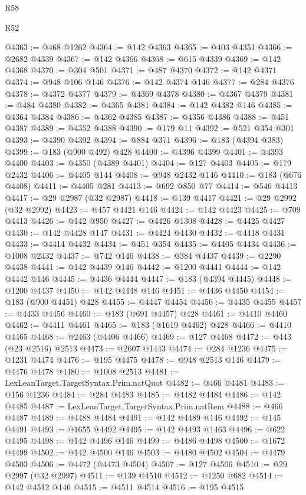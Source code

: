 \begin{lexlean}{R58}
\begin{lexlean}{R52}
\begin{coremodule}
{{{{{{{{{{{{{{{{{{{{{{{{{{{{{{{{{{{{{{{{{{{{{{{{{{{{{{{{{{{{{{{{{{{{{{{{{{{{{{{{{{{{{{{{{{{{{{{{{{{{{{{{{{{{{{{{{{{{{{{{{{{{{{{{{{{{{{{{{{{{{{{{{{{{{{{{{{{{{{{{{{{{{{{{{{{{{{{{{{{{{{{{{{{{{{{{{{{{{{@4363 := @468 @1262
@4364 := @142 @4363
@4365 := @403 @4351
@4366 := @2682 @4339
@4367 := @142 @4366
@4368 := @615 @4339
@4369 := @142 @4368
@4370 := @304 @501
@4371 := @487 @4370
@4372 := @142 @4371
@4374 := @948 @106 @146
@4376 := @142 @4374 @146
@4377 := @284 @4376
@4378 := @4372 @4377
@4379 := @4369 @4378
@4380 := @4367 @4379
@4381 := @484 @4380
@4382 := @4365 @4381
@4384 := @142 @4382 @146
@4385 := @4364 @4384
@4386 := @4362 @4385
@4387 := @4356 @4386
@4388 := @451 @4387
@4389 := @4352 @4388
@4390 := @179 @11
@4392 := @521 @354 @301
@4393 := @4390 @4392
@4394 := @884 @371
@4396 := @183 (@4394 @383)
@4399 := @183 (@900 @492) @428
@4400 := @4396 @4399
@4401 := @4393 @4400
@4403 := @4350 (@4389 @4401)
@4404 := @127 @4403
@4405 := @179 @2432
@4406 := @4405 @144
@4408 := @948 @2432 @146
@4410 := @183 (@676 @4408)
@4411 := @4405 @281
@4413 := @692 @850 @77
@4414 := @546 @4413
@4417 := @29 @2987 (@32 @2987)
@4418 := @139 @4417
@4421 := @29 @2992 (@32 @2992)
@4423 := @457 @4421 @146
@4424 := @142 @4423
@4425 := @709 @4413
@4426 := @142 @950
@4427 := @4426 @1308
@4428 := @4425 @4427
@4430 := @142 @4428 @147
@4431 := @4424 @4430
@4432 := @4418 @4431
@4433 := @4414 @4432
@4434 := @451 @354
@4435 := @4405 @4434
@4436 := @1008 @2432
@4437 := @742 @146
@4438 := @384 @4437
@4439 := @2290 @4438
@4441 := @142 @4439 @146
@4442 := @1200 @4441
@4444 := @142 @4442 @146
@4445 := @4436 @4444
@4447 := @183 (@4394 @4445)
@4448 := @1200 @4437
@4450 := @142 @4448 @146
@4451 := @4436 @4450
@4454 := @183 (@900 @4451) @428
@4455 := @4447 @4454
@4456 := @4435 @4455
@4457 := @4433 @4456
@4460 := @183 (@691 @4457) @428
@4461 := @4410 @4460
@4462 := @4411 @4461
@4465 := @183 (@1619 @4462) @428
@4466 := @4410 @4465
@4468 := @2463 (@4406 @4466)
@4469 := @127 @4468
@4472 := @443 (@23 @2516) @2513
@4473 := @2607 @1443
@4474 := @284 @1236
@4475 := @1231 @4474
@4476 := @195 @4475
@4478 := @948 @2513 @146
@4479 := @4476 @4478
@4480 := @1008 @2513
@4481 := LexLeanTarget.TargetSyntax.Prim.natQuot
@4482 := @466 @4481
@4483 := @156 @1236
@4484 := @284 @4483
@4485 := @4482 @4484
@4486 := @142 @4485
@4487 := LexLeanTarget.TargetSyntax.Prim.natRem
@4488 := @466 @4487
@4489 := @4488 @4484
@4491 := @142 @4489 @146
@4492 := @145 @4491
@4493 := @1655 @4492
@4495 := @142 @4493 @1463
@4496 := @622 @4495
@4498 := @142 @4496 @146
@4499 := @4486 @4498
@4500 := @1672 @4499
@4502 := @142 @4500 @146
@4503 := @4480 @4502
@4504 := @4479 @4503
@4506 := @4472 (@4473 @4504)
@4507 := @127 @4506
@4510 := @29 @2997 (@32 @2997)
@4511 := @139 @4510
@4512 := @1250 @682
@4514 := @142 @4512 @146
@4515 := @4511 @4514
@4516 := @195 @4515
}}}}}}}}}}}}}}}}}}}}}}}}}}}}}}}}}}}}}}}}}}}}}}}}}}}}}}}}}}}}}}}}}}}}}}}}}}}}}}}}}}}}}}}}}}}}}}}}}}}}}}}}}}}}}}}}}}}}}}}}}}}}}}}}}}}}}}}}}}}}}}}}}}}}}}}}}}}}}}}}}}}}}}}}}}}}}}}}}}}}}}}}}}}}}}}}}}}}}}
\end{coremodule}
\end{lexlean}
\end{lexlean}
